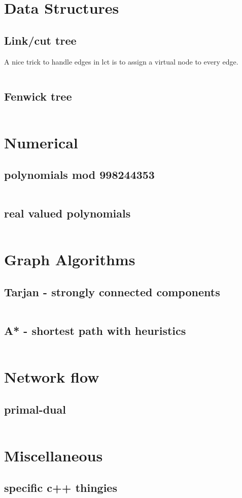 \documentclass[portrait, 8pt, a4paper, oneside, landscape]{extarticle}
\begin{document}
\thispagestyle{empty}
\begin{figure}[h!]

\end{figure}
\newpage

\twocolumn
\maketitlepage
\newpage

\section{Data Structures}
\subsection{Link/cut tree}
A nice trick to handle edges in lct is to assign a virtual node to every edge.
\inputminted{cpp}{src/lct.cpp}
\subsection{Fenwick tree}
\inputminted{cpp}{src/fenwick2d.cpp}

\section{Numerical}
\subsection{polynomials mod 998244353}
\inputminted{cpp}{src/poly_mod.cpp}

\subsection{real valued polynomials}
\inputminted{cpp}{src/poly.cpp}

\section{Graph Algorithms}

\subsection{Tarjan - strongly connected components}
\inputminted{cpp}{src/scc.cpp}

\subsection{A* - shortest path with heuristics}
\inputminted{rust}{src/a_star.rs}

\section{Network flow}
\subsection{primal-dual}
\inputminted{cpp}{src/primal_dual.cpp}

\section{Miscellaneous}
\subsection{specific c++ thingies}
\inputminted{cpp}{src/cpp_utils.cpp}
\end{document}

